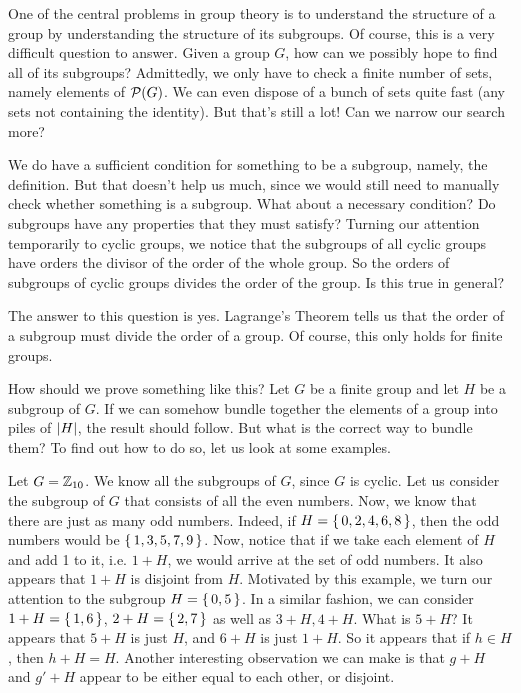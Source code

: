 \documentclass[./main.tex]{subfiles}
\begin{document}
One of the central problems in group theory is to understand the structure of a
group by understanding the structure of its subgroups. Of course, this is a very
difficult question to answer. Given a group $G$, how can we possibly hope to
find all of its subgroups? Admittedly, we only have to check a finite number of
sets, namely elements of $\mathcal{P}(G)$. We can even dispose of a bunch of sets
quite fast (any sets not containing the identity). But that's still a lot! Can
we narrow our search more? 

We do have a sufficient condition for something to be a subgroup, namely, the
definition. But that doesn't help us much, since we would still need to manually
check whether something is a subgroup. What about a necessary condition? Do
subgroups have any properties that they must satisfy? Turning our attention
temporarily to cyclic groups, we notice that the subgroups of all cyclic groups
have orders the divisor of the order of the whole group. So the orders of
subgroups of cyclic groups divides the order of the group. Is this true in
general? 

The answer to this question is yes. Lagrange's Theorem tells us that the order
of a subgroup must divide the order of a group. Of course, this only holds for
finite groups. 

How should we prove something like this? Let $G$ be a finite group and let $H$
be a subgroup of $G$. If we can somehow bundle together the elements of a group
into piles of $\abs{H}$, the result should follow. But what is the correct way
to bundle them? To find out how to do so, let us look at some examples.

Let $G = \mathbb{Z}_{10}$. We know all the subgroups of $G$, since $G$ is cyclic. Let
us consider the subgroup of $G$ that consists of all the even numbers. Now, we
know that there are just as many odd numbers. Indeed, if $H = \set{0,2,4,6,8}$,
then the odd numbers would be $\set{1,3,5,7,9}$. Now, notice that if we take
each element of $H$ and add 1 to it, i.e. $1 + H$, we would arrive at the set of
odd numbers. It also appears that $1 + H$ is disjoint from $H$. Motivated by
this example, we turn our attention to the subgroup $H = \set{0,5}$. In a
similar fashion, we can consider $1 + H = \set{1, 6}$, $2+H = \set{2,7}$ as well
as $3+H, 4+H$. What is $5+H$? It appears that $5+H$ is just $H$, and $6+H$ is
just $1+H$. So it appears that if $h \in H$, then $h+H = H$. Another interesting
observation we can make is that $g + H$ and $g'+H$ appear to be either equal to
each other, or disjoint. 
\end{document}
